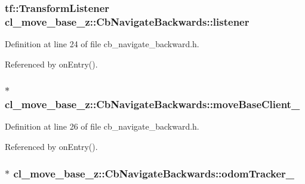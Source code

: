 \subsubsection[{\texorpdfstring{listener}{listener}}]{\setlength{\rightskip}{0pt plus 5cm}tf\+::\+Transform\+Listener cl\+\_\+move\+\_\+base\+\_\+z\+::\+Cb\+Navigate\+Backwards\+::listener}\hypertarget{classcl__move__base__z_1_1CbNavigateBackwards_a86be71ac1dd72f318875bee13259f3da}{}\label{classcl__move__base__z_1_1CbNavigateBackwards_a86be71ac1dd72f318875bee13259f3da}


Definition at line 24 of file cb\+\_\+navigate\+\_\+backward.\+h.



Referenced by on\+Entry().

\subsubsection[{\texorpdfstring{move\+Base\+Client\+\_\+}{moveBaseClient_}}]{$\ast$ cl\+\_\+move\+\_\+base\+\_\+z\+::\+Cb\+Navigate\+Backwards\+::move\+Base\+Client\+\_\+}\hypertarget{classcl__move__base__z_1_1CbNavigateBackwards_a943c1a790eac9266adf11fbdc078f03a}{}\label{classcl__move__base__z_1_1CbNavigateBackwards_a943c1a790eac9266adf11fbdc078f03a}


Definition at line 26 of file cb\+\_\+navigate\+\_\+backward.\+h.



Referenced by on\+Entry().

\subsubsection[{\texorpdfstring{odom\+Tracker\+\_\+}{odomTracker_}}]{$\ast$ cl\+\_\+move\+\_\+base\+\_\+z\+::\+Cb\+Navigate\+Backwards\+::odom\+Tracker\+\_\+}\hypertarget{classcl__move__base__z_1_1CbNavigateBackwards_a75a8ae7aef6c72e96f4037c4941b0341}{}\label{classcl__move__base__z_1_1CbNavigateBackwards_a75a8ae7aef6c72e96f4037c4941b0341}


